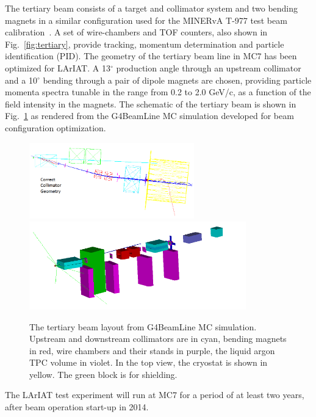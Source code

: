 \documentclass[DIV=calc, paper=a4, fontsize=10pt, twocolumn]{scrartcl}	 %
\begin{document}
{The tertiary beam consists of a target and collimator system and two bending magnets in a similar configuration used for the  MINERvA T-977 test beam calibration~\cite{MinervaTest}. A set of wire-chambers and TOF counters, also shown in Fig.~\ref{fig:tertiary}, provide tracking, momentum determination and particle identification (PID). The geometry of the tertiary beam line in MC7 has been optimized for LArIAT.  A 13$^\circ$ production angle through an upstream collimator and a 10$^\circ$ bending through a pair of dipole magnets are chosen, providing  particle momenta spectra tunable in the range from 0.2 to 2.0 GeV/c, as a function of the field intensity in the magnets. The schematic of the tertiary beam is shown in Fig.~\ref{fig:tert-layout} as rendered from the G4BeamLine MC simulation developed for beam configuration optimization.

\begin{figure}[!h]
\begin{centering}
\vspace{-0.3cm}
\includegraphics[height=1.3in]{Figures/beamgeo}
\includegraphics[height=1.5in]{Figures/tertbmsimu}
\caption{
{\scriptsize \sf The tertiary beam layout from G4BeamLine MC simulation. Upstream and downstream collimators are in cyan, bending magnets in red, wire chambers and their stands in purple, the liquid argon TPC volume in violet.  In the top view, the cryostat is shown in yellow. The green block is for shielding.}
}
\label{fig:tert-layout}
\end{centering}
\end{figure}
The LArIAT test experiment will run at MC7 for a period of at least two years, after beam operation start-up in 2014.

}
\end{document}
